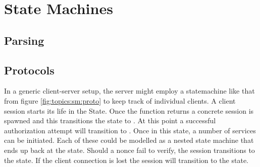 \section{State Machines}



\subsection{Parsing}

\subsection{Protocols}

In a generic client-server setup, the server might employ a statemachine like that from figure \ref{fig:topics:sm:proto} to keep track of individual clients. A client session starts its life in the  State. Once the  function returns a concrete session is spawned and this transitions the state to . At this point a successful authorization attempt will transition to . Once in this state, a number of services can be initiated. Each of these could be modelled as a nested state machine that ends up back at the  state. Should a nonce fail to verify, the session transitions to the  state. If the client connection is lost the session will transition to the  state.

